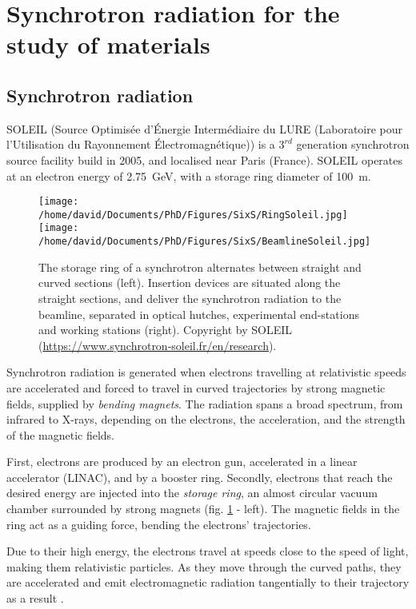 \section{Synchrotron radiation for the study of materials} \label{sec:SIXS}

\subsection{Synchrotron radiation}

SOLEIL (Source Optimisée d’Énergie Intermédiaire du LURE (Laboratoire pour l’Utilisation du Rayonnement Électromagnétique)) is a $3^{rd}$ generation synchrotron source facility build in 2005, and localised near Paris (France).
SOLEIL operates at an electron energy of \qty{2.75}{\GeV}, with a storage ring diameter of \qty{100}{\m}.

\begin{figure}[!htb]
    \centering
    \texttt{[image: /home/david/Documents/PhD/Figures/SixS/RingSoleil.jpg]}
    \texttt{[image: /home/david/Documents/PhD/Figures/SixS/BeamlineSoleil.jpg]}
    \caption{
    	The storage ring of a synchrotron alternates between straight and curved sections (left).
        Insertion devices are situated along the straight sections, and deliver the synchrotron radiation to the beamline, separated in optical hutches, experimental end-stations and working stations (right).
    	Copyright by SOLEIL (\url{https://www.synchrotron-soleil.fr/en/research}).
    }
    \label{fig:SOLEIL}
\end{figure}

Synchrotron radiation is generated when electrons travelling at relativistic speeds are accelerated and forced to travel in curved trajectories by strong magnetic fields, supplied by \textit{bending magnets}.
The radiation spans a broad spectrum, from infrared to X-rays, depending on the electrons, the acceleration, and the strength of the magnetic fields.

First, electrons are produced by an electron gun, accelerated in a linear accelerator (LINAC), and by a booster ring.
Secondly, electrons that reach the desired energy are injected into the \textit{storage ring}, an almost circular vacuum chamber surrounded by strong magnets (fig. \ref{fig:SOLEIL} - left).
The magnetic fields in the ring act as a guiding force, bending the electrons' trajectories.

Due to their high energy, the electrons travel at speeds close to the speed of light, making them relativistic particles.
As they move through the curved paths, they are accelerated and emit electromagnetic radiation tangentially to their trajectory as a result \parencite{Willmott, NielsenMcMorrow}.

